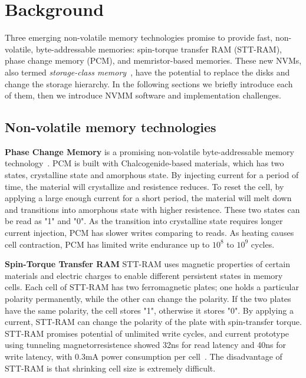 \section{Background}
\label{sec:background}

Three emerging non-volatile memory technologies promise to provide fast,
 non-volatile, byte-addressable memories: spin-torque transfer RAM (STT-RAM),
phase change memory (PCM), and memristor-based memories. These new NVMs, also
termed \emph{storage-class memory}~\cite{scm}, have the potential to replace
the disks and change the storage hierarchy. In the following
sections we briefly introduce each of them, then we introduce 
NVMM software and implementation challenges.

\subsection{Non-volatile memory technologies}
\label{sec:hardware}

\textbf{Phase Change Memory} is a promising non-volatile byte-addressable
memory technology~\cite{PCM_EfficientMainMemory, PCMHierarchy}.
PCM is built with Chalcogenide-based materials, which has
two states, crystalline state and amorphous state. By
injecting current for a period of time,
the material will crystallize and resistence reduces. 
To reset the cell,
by applying a large enough current for a short period, 
the material will melt down
and transitions into amorphous state with higher resistence.
These two states can be read as "1" and "0". As the transition into crystalline
state requires longer current injection, PCM has slower writes comparing to
reads.  
As heating causes cell contraction, PCM has limited write endurance
up to $10^8$ to $10^9$ cycles.
 
\textbf{Spin-Torque Transfer RAM} STT-RAM uses magnetic properties of 
certain materials and electric charges to enable different persistent states 
in memory cells. Each cell of STT-RAM has two ferromagnetic plates;
one holds a particular polarity permanently, while the other can change the
polarity. If the two plates have the same polarity, the cell stores "1",
otherwise it stores "0". By applying a current, STT-RAM can change the polarity
of the plate with spin-transfer torque.
STT-RAM promises potential of unlimited write cycles, and
current prototype using tunneling magnetorresistence showed 32ns for
read latency and 40ns for write latency, with 0.3mA power consumption
per cell~\cite{sttram}. The disadvantage of STT-RAM is that 
shrinking cell size is extremely difficult.


